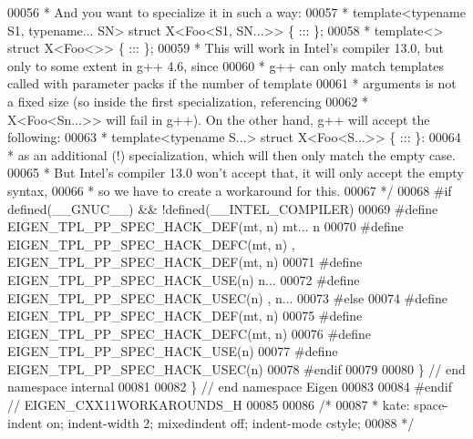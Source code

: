 \begin{DoxyCode}
00056 \textcolor{comment}{ * And you want to specialize it in such a way:}
00057 \textcolor{comment}{ *    template<typename S1, typename... SN> struct X<Foo<S1, SN...>> \{ ::: \};}
00058 \textcolor{comment}{ *    template<>                            struct X<Foo<>>          \{ ::: \};}
00059 \textcolor{comment}{ * This will work in Intel's compiler 13.0, but only to some extent in g++ 4.6, since}
00060 \textcolor{comment}{ * g++ can only match templates called with parameter packs if the number of template}
00061 \textcolor{comment}{ * arguments is not a fixed size (so inside the first specialization, referencing}
00062 \textcolor{comment}{ * X<Foo<Sn...>> will fail in g++). On the other hand, g++ will accept the following:}
00063 \textcolor{comment}{ *    template<typename S...> struct X<Foo<S...>> \{ ::: \}:}
00064 \textcolor{comment}{ * as an additional (!) specialization, which will then only match the empty case.}
00065 \textcolor{comment}{ * But Intel's compiler 13.0 won't accept that, it will only accept the empty syntax,}
00066 \textcolor{comment}{ * so we have to create a workaround for this.}
00067 \textcolor{comment}{ */}
00068 \textcolor{preprocessor}{#if defined(\_\_GNUC\_\_) && !defined(\_\_INTEL\_COMPILER)}
00069 \textcolor{preprocessor}{#define EIGEN\_TPL\_PP\_SPEC\_HACK\_DEF(mt, n)    mt... n}
00070 \textcolor{preprocessor}{#define EIGEN\_TPL\_PP\_SPEC\_HACK\_DEFC(mt, n)   , EIGEN\_TPL\_PP\_SPEC\_HACK\_DEF(mt, n)}
00071 \textcolor{preprocessor}{#define EIGEN\_TPL\_PP\_SPEC\_HACK\_USE(n)        n...}
00072 \textcolor{preprocessor}{#define EIGEN\_TPL\_PP\_SPEC\_HACK\_USEC(n)       , n...}
00073 \textcolor{preprocessor}{#else}
00074 \textcolor{preprocessor}{#define EIGEN\_TPL\_PP\_SPEC\_HACK\_DEF(mt, n)}
00075 \textcolor{preprocessor}{#define EIGEN\_TPL\_PP\_SPEC\_HACK\_DEFC(mt, n)}
00076 \textcolor{preprocessor}{#define EIGEN\_TPL\_PP\_SPEC\_HACK\_USE(n)}
00077 \textcolor{preprocessor}{#define EIGEN\_TPL\_PP\_SPEC\_HACK\_USEC(n)}
00078 \textcolor{preprocessor}{#endif}
00079 
00080 \} \textcolor{comment}{// end namespace internal}
00081 
00082 \} \textcolor{comment}{// end namespace Eigen}
00083 
00084 \textcolor{preprocessor}{#endif // EIGEN\_CXX11WORKAROUNDS\_H}
00085 
00086 \textcolor{comment}{/*}
00087 \textcolor{comment}{ * kate: space-indent on; indent-width 2; mixedindent off; indent-mode cstyle;}
00088 \textcolor{comment}{ */}
\end{DoxyCode}
